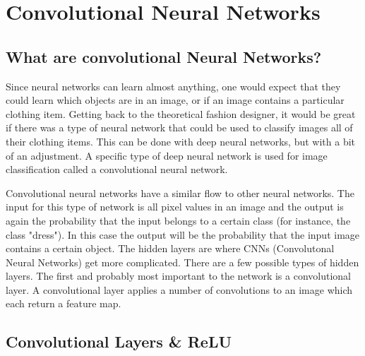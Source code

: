 \documentclass[12pt]{report} %
\begin{document}
\chapter{Convolutional Neural Networks}
\section{What are convolutional Neural Networks?}
	Since neural networks can learn almost anything, one would expect that they could learn which objects are in an image, or if an image contains a particular clothing item. Getting back to the theoretical fashion designer, it would be great if there was a type of neural network that could be used to classify images all of their clothing items. This can be done with deep neural networks, but with a bit of an adjustment. A specific type of deep neural network is used for image classification called a convolutional neural network. 

	Convolutional neural networks have a similar flow to other neural networks. The input for this type of network is all pixel values in an image and the output is again the probability that the input belongs to a certain class (for instance, the class "dress"). In this case the output will be the probability that the input image contains a certain object. The hidden layers are where CNNs (Convolutonal Neural Networks) get more complicated. There are a few possible types of hidden layers. The first and probably most important to the network is a convolutional layer. A convolutional layer applies a number of convolutions to an image which each return a feature map\cite{aurelienMachineLearning}. 

\section{Convolutional Layers \& ReLU}
	
\end{document}
